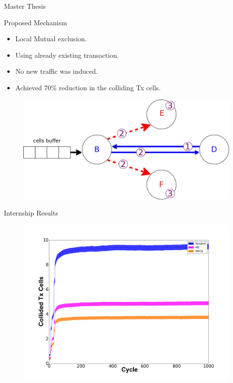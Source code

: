 \documentclass{beamer}
\begin{document}
\begin{frame}{Master Thesis}

\begin{block}{Proposed Mechanism}
    \begin{itemize}
    \item Local Mutual exclusion.  
    \item<2-> Using already existing transaction. 
     \item<3-> No new traffic was induced. 
      \item<4-> Achieved 70\% reduction in the colliding Tx cells. 
    \end{itemize}
    \end{block}


\centering
\begin{figure}[ht]

\item<2-> \includegraphics[width=.65\linewidth]{mech.jpeg}

\end{figure}
\end{frame}

\begin{frame}{Internship Results}


\begin{figure}[ht]


 \includegraphics[width=.9\linewidth]{Graph2.png}
\end{figure}


 
\end{frame}
\end{document}
